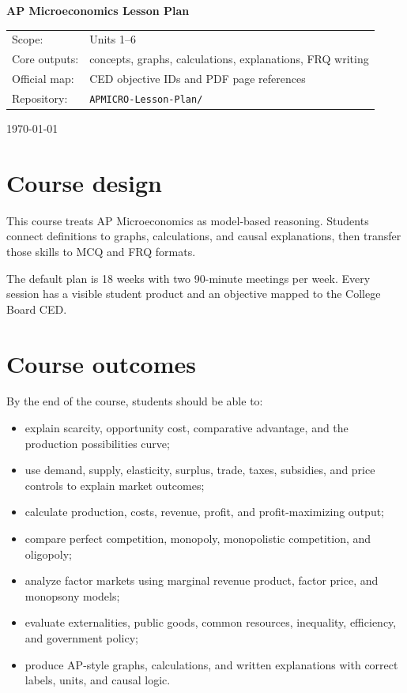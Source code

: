 \documentclass[11pt,a4paper]{article}
\newcommand{\codepath}[1]{\texttt{\small #1}}
\begin{document}
\begin{titlepage}\centering\vspace*{2cm}
{\Huge\bfseries AP Microeconomics Lesson Plan\par}\vspace{0.5cm}{\LARGE 36-session course framework and session design\par}
\vspace{1cm}{\large 18 weeks \textperiodcentered 2 meetings per week \textperiodcentered 90 minutes per meeting\par}
\vspace{0.5cm}{\large English edition\par}\vfill
\begin{tabular}{ll}Scope: & Units 1--6\\Core outputs: & concepts, graphs, calculations, explanations, FRQ writing\\Official map: & CED objective IDs and PDF page references\\Repository: & \codepath{APMICRO-Lesson-Plan/}\\\end{tabular}
\vfill{\large \today\par}\end{titlepage}
\tableofcontents\newpage
\section{Course design}
This course treats AP Microeconomics as model-based reasoning. Students connect definitions to graphs, calculations, and causal explanations, then transfer those skills to MCQ and FRQ formats.

The default plan is 18 weeks with two 90-minute meetings per week. Every session has a visible student product and an objective mapped to the College Board CED.

\section{Course outcomes}
By the end of the course, students should be able to:
\begin{itemize}[leftmargin=2em]
\item explain scarcity, opportunity cost, comparative advantage, and the production possibilities curve;
\item use demand, supply, elasticity, surplus, trade, taxes, subsidies, and price controls to explain market outcomes;
\item calculate production, costs, revenue, profit, and profit-maximizing output;
\item compare perfect competition, monopoly, monopolistic competition, and oligopoly;
\item analyze factor markets using marginal revenue product, factor price, and monopsony models;
\item evaluate externalities, public goods, common resources, inequality, efficiency, and government policy;
\item produce AP-style graphs, calculations, and written explanations with correct labels, units, and causal logic.
\end{itemize}
\end{document}
